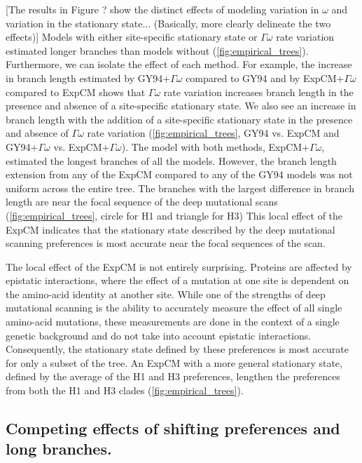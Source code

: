 \documentclass[11pt]{article}
\newcommand\jdbcomment[1]{{\color{red}[#1]}}
\begin{document}
\jdbcomment{The results in Figure ? show the distinct effects of modeling variation in $\omega$ and variation in the stationary state... (Basically, more clearly delineate the two effects)}
Models with either site-specific stationary state or $\Gamma\omega$ rate variation estimated longer branches than models without (\ref{fig:empirical_trees}). 
Furthermore, we can isolate the effect of each method. 
For example, the increase in branch length estimated by GY94+$\Gamma\omega$ compared to GY94 and by ExpCM+$\Gamma\omega$ compared to ExpCM shows that $\Gamma\omega$ rate variation increases branch length in the presence and absence of a site-specific stationary state. 
We also see an increase in branch length with the addition of a site-specific stationary state in the presence and absence of $\Gamma\omega$ rate variation (\ref{fig:empirical_trees}, GY94 vs. ExpCM and GY94+$\Gamma\omega$ vs. ExpCM+$\Gamma\omega$). 
The model with both methods, ExpCM+$\Gamma\omega$, estimated the longest branches of all the models. 
However, the branch length extension from any of the ExpCM compared to any of the GY94 models was not uniform across the entire tree. 
The branches with the largest difference in branch length are near the focal sequence of the deep mutational scans (\ref{fig:empirical_trees}, circle for H1 and triangle for H3)
This local effect of the ExpCM indicates that the stationary state described by the deep mutational scanning preferences is most accurate near the focal sequences of the scan. 

The local effect of the ExpCM is not entirely surprising. 
Proteins are affected by epistatic interactions, where the effect of a mutation at one site is dependent on the amino-acid identity at another site. 
While one of the strengths of deep mutational scanning is the ability to accurately measure the effect of all single amino-acid mutations, these measurements are done in the context of a single genetic background and do not take into account epistatic interactions. 
Consequently, the stationary state defined by these preferences is most accurate for only a subset of the tree.
An ExpCM with a more general stationary state, defined by the average of the H1 and H3 preferences, lengthen the preferences from both the H1 and H3 clades (\ref{fig:empirical_trees}). 

\subsection*{Competing effects of shifting preferences and long branches.}
\end{document}
